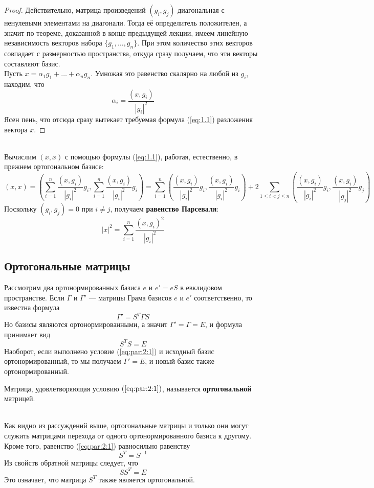 \documentclass[11pt]{article}
\begin{document}
\begin{proof}
    Действительно, матрица произведений $(g_i, g_j)$ диагональная с ненулевыми элементами на диагонали. Тогда её определитель положителен, а значит по теореме, доказанной в конце предыдущей лекции, имеем линейную независимость векторов набора $\{g_1, \ldots, g_n\}$. При этом количество этих векторов совпадает с размерностью пространства, откуда сразу получаем, что эти векторы составляют базис. \\
    Пусть $x = \alpha_1 g_1 + \ldots + \alpha_n g_n$. Умножая это равенство скалярно на любой из $g_i$, находим, что 
    \[\alpha_i = \frac{(x, g_i)}{\left\lvert g_i \right\rvert^2}\]
    Ясен пень, что отсюда сразу вытекает требуемая формула (\ref{eq:1.1}) разложения вектора $x$.
\end{proof} \leavevmode
\\
Вычислим $(x, x)$ с помощью формулы (\ref{eq:1.1}), работая, естественно, в прежнем ортогональном базисе:
\[(x, x) = \left(\sum_{i = 1}^n \frac{(x, g_i)}{\left\lvert g_i \right\rvert^2} g_i, \sum_{i = 1}^n \frac{(x, g_i)}{\left\lvert g_i \right\rvert^2} g_i\right) = \sum_{i = 1}^n \left(\frac{(x, g_i)}{\left\lvert g_i \right\rvert^2} g_i, \frac{(x, g_i)}{\left\lvert g_i \right\rvert^2} g_i \right) + 2 \sum_{1 \leq i < j \leq n} \left(\frac{(x, g_i)}{\left\lvert g_i \right\rvert^2} g_i, \frac{(x, g_i)}{\left\lvert g_j \right\rvert^2} g_j\right)\]
Поскольку $(g_i, g_j) = 0$ при $i \neq j$, получаем \textbf{равенство Парсеваля}:
\[\left\lvert x \right\rvert^2 = \sum_{i = 1}^n \frac{(x, g_i)^2}{\left\lvert g_i \right\rvert^2}\]

\subsection{Ортогональные матрицы}

Рассмотрим два ортонормированных базиса $e$ и $e' = eS$ в евклидовом пространстве. Если $\Gamma$ и $\Gamma'$ --- матрицы Грама базисов $e$ и $e'$ соответственно, то известна формула
\[\Gamma' = S^T \Gamma S\]
Но базисы являются ортонормированными, а значит $\Gamma' = \Gamma = E$, и формула принимает вид
\begin{equation} \label{eq:par:2:1}
    S^TS = E
\end{equation}
Наоборот, если выполнено условие (\ref{eq:par:2:1}) и исходный базис ортонормированный, то мы получаем $\Gamma' = E$, и новый базис также ортонормированный.

\begin{definition}
    Матрица, удовлетворяющая условию $(\ref{eq:par:2:1})$, называется \textbf{ортогональной} матрицей.
\end{definition} \leavevmode
\\
Как видно из рассуждений выше, ортогональные матрицы и только они могут служить матрицами перехода от одного ортонормированного базиса к другому. Кроме того, равенство (\ref{eq:par:2:1}) равносильно равенству
\[S^T = S^{-1}\]
Из свойств обратной матрицы следует, что
\[SS^T = E\]
Это означает, что матрица $S^T$ также является ортогональной. 
\end{document}
